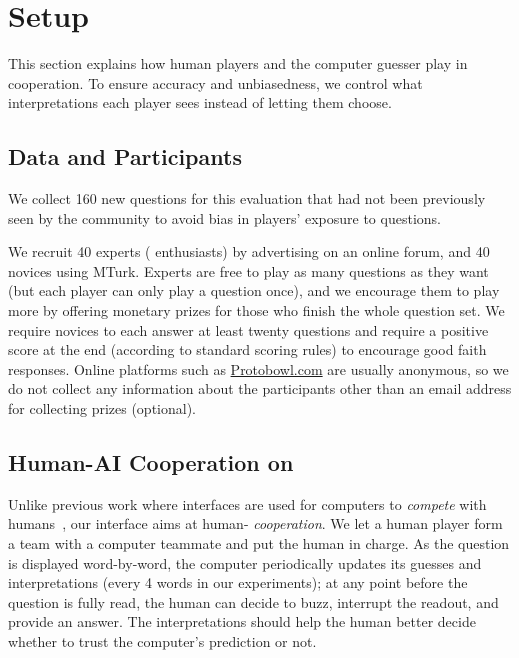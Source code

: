 \section{Setup}
\label{sec:setup}

This section explains how human players and the computer guesser play
in cooperation. To ensure accuracy and unbiasedness, we control what
interpretations each player sees instead of letting them choose.

\subsection{Data and Participants}

We collect 160 new questions for this evaluation that had not been 
previously seen by the \qb{} community to avoid bias in players'
exposure to questions.

We recruit 40 experts (\qb{} enthusiasts) by advertising on an
online forum, and 40 novices using MTurk. Experts are
free to play as many questions as they want (but each player can only
play a question once), and we encourage them to play more by offering
monetary prizes for those who finish the whole question set. We
require novices to each answer at least twenty questions and require
a positive score at the end (according to standard \qb{} scoring
rules) to encourage good faith responses. Online \qb{} platforms such
as \url{Protobowl.com} are usually anonymous, so we do not collect
any information about the participants other than an email
address for collecting prizes (optional).

\subsection{Human-AI Cooperation on \qb{}}

Unlike previous work where \qb{} interfaces are used for computers to
\emph{compete} with
humans~\cite{boydgraber2012besting,he2016opponent}, our interface aims
at human- \emph{cooperation}. We let a human player form a
team with a computer teammate and put the human in charge.  As the
question is displayed word-by-word, the computer periodically updates
its guesses and interpretations (every 4 words in our experiments); at
any point before the question is fully read, the human can decide to
buzz, interrupt the readout, and provide an answer. The
interpretations should help the human better decide whether to
trust the computer's prediction or not.

